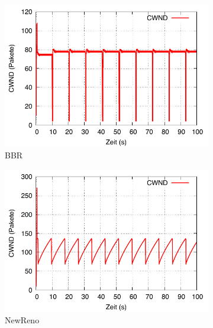 \documentclass[paper=a4,fontsize=12pt,ngerman]{scrartcl}
\begin{document}
\begin{figure}[H]
    \centering

    \begin{subfigure}{0.40\textwidth}

        \includegraphics[width=\linewidth]{graphics/bbrCW.pdf}
        \caption{BBR}
        \label{fig:bbr}
    \end{subfigure}
    \hfill
    \begin{subfigure}{0.40\textwidth}
        \includegraphics[width=\linewidth]{graphics/newRenoCW.pdf}
        \caption{NewReno}
        \label{fig:newreno}
    \end{subfigure}
    \hfill
    \begin{subfigure}{0.40\textwidth}

\end{subfigure}
\end{figure}
\end{document}
